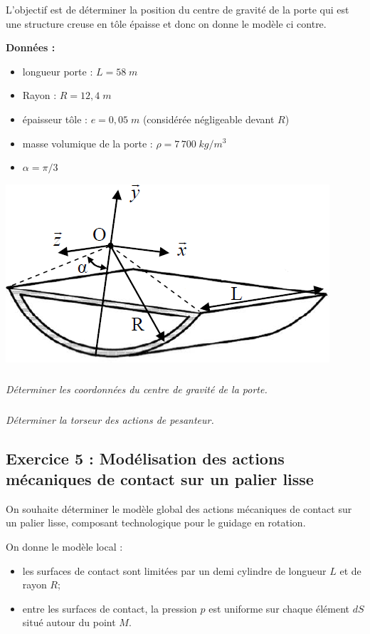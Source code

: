 \documentclass[10pt,fleqn]{article} %
\begin{document}
\begin{multicols}{2}
L'objectif est de déterminer la position du centre de gravité de la porte qui est une structure creuse en tôle épaisse et donc on donne le modèle ci contre.

\textbf{Données :}
\begin{itemize}
\item longueur porte : $L=58\;m$
\item Rayon : $R=12,4\;m$
\item épaisseur tôle : $e=0,05\;m$ (considérée négligeable devant $R$)
\item masse volumique de la porte : $\rho=7\,700 \; kg/m^3$
\item $\alpha=\pi/3$
\end{itemize}

\begin{center}
\includegraphics[width=.9\linewidth]{images/fig3}
\end{center}


\subparagraph{}
\textit{Déterminer les coordonnées du centre de gravité de la porte.}
\subparagraph{}
\textit{Déterminer la torseur des actions de pesanteur.}


\subsection*{Exercice 5 : Modélisation des actions mécaniques de contact sur un palier lisse}

On souhaite déterminer le modèle global des actions mécaniques de contact sur un palier lisse, composant technologique pour le guidage en rotation.

On donne le modèle local :
\begin{itemize}
\item les surfaces de contact sont limitées par un demi cylindre de longueur $L$ et de rayon $R$;
\item entre les surfaces de contact, la pression $p$ est uniforme sur chaque élément $dS$ situé autour du point $M$.
\end{itemize}


\end{multicols}
\end{document}

